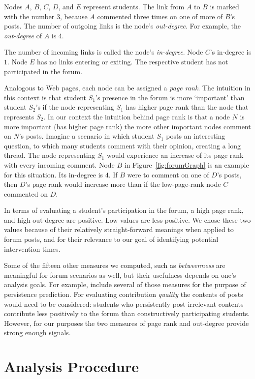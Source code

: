 Nodes $A$, $B$, $C$, $D$, and $E$ represent students. The link from
$A$ to $B$ is marked with the number $3$, because $A$ commented three
times on one of more of $B$'s posts. The number of outgoing links is
the node's {\em out-degree}. For example, the {\em out-degree} of $A$
is $4$.

The number of incoming links is called the node's {\em
  in-degree}. Node $C$'s in-degree is $1$. Node $E$ has no links
entering or exiting. The respective student has not participated in
the forum.

Analogous to Web pages, each node can be assigned a {\em page
  rank}. The intuition in this context is that student $S_1$'s
presence in the forum is more `important' than student $S_2$'s if the
node representing $S_1$ has higher page rank than the node that
represents $S_2$. In our context the intuition behind page rank is
that a node $N$ is more important (has higher page rank) the more
other important nodes comment on $N$'s posts. Imagine a scenario in
which student $S_1$ posts an interesting question, to which many
students comment with their opinion, creating a long thread. The node
representing $S_1$ would experience an increase of its page rank with
every incoming comment. Node $B$ in Figure~\ref{fig:forumGraph} is an
example for this situation. Its in-degree is $4$. If $B$ were to
comment on one of $D$'s posts, then $D$'s page rank would increase
more than if the low-page-rank node $C$ commented on $D$.

In terms of evaluating a student's participation in the forum, a high
page rank, and high out-degree are positive. Low values are less
positive. We chose these two values because of their relatively
straight-forward meanings when applied to forum posts, and for their
relevance to our goal of identifying potential intervention times.

Some of the fifteen other measures we computed, such as {\em
  betweenness} are meaningful for forum scenarios as well, but their
usefulness depends on one's analysis goals. For example,
\cite{yang2013} include several of those measures for the purpose of
persistence prediction. For evaluating contribution {\em quality} the
contents of posts would need to be considered: students who
persistently post irrelevant contents contribute less positively to
the forum than constructively participating students. However, for our
purposes the two measures of page rank and out-degree provide strong
enough signals.

\section{Analysis Procedure}

